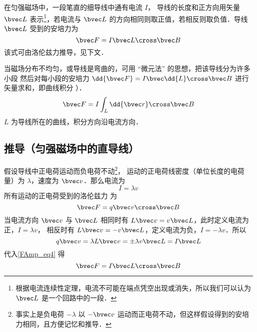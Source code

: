 

在匀强磁场中，一段笔直的细导线中通有电流 $I$， 导线的长度和正方向用矢量 $\bvec L$ 表示\footnote{根据电流连续性定理，电流不可能在端点凭空出现或消失，所以我们可以认为 $\bvec L$ 是一个回路中的一段．}，若电流与 $\bvec L$ 的方向相同则取正值，若相反则取负值．导线 $\bvec L$ 受到的安培力为
\begin{equation}\label{FAmp_eq1}
\bvec F = I \bvec L \cross \bvec B
\end{equation}
该式可由洛伦兹力推导，见下文．

当磁场分布不均匀，或导线是弯曲的，可用 “微元法” 的思想，把该导线分为许多小段
然后对每小段的安培力 $\dd{\bvec F} = I\bvec \dd{L} \cross\bvec B$ 进行矢量求和，即曲线积分%
）．
\begin{equation}
\bvec F = I\int_L \dd{\bvec r} \cross \bvec B
\end{equation}
$L$ 为导线所在的曲线，积分方向沿电流方向．

\subsection{推导（匀强磁场中的直导线）}
假设导线中正电荷运动而负电荷不动\footnote{事实上是负电荷 $-\lambda$ 以 $-\bvec v$ 运动而正电荷不动，但这样假设得到的安培力相同，且方便记忆和推导．}， 运动的正电荷线密度（单位长度的电荷量）为 $\lambda$，速度为 $\bvec v$．那么电流为%
\begin{equation}
I = \lambda v
\end{equation}
所有运动的正电荷受到的洛伦兹力%
为
\begin{equation}\label{FAmp_eq4}
\bvec F =  q\bvec v \cross \bvec B
\end{equation}
当电流方向 $\bvec v$ 与 $\bvec L$ 相同时有 $L \bvec v = v \bvec L$，此时定义电流为正，$I = \lambda v$， 相反时有 $L \bvec v = -v\bvec L$，定义电流为负，$I = -\lambda v$．所以
\begin{equation}
q\bvec v = \lambda L \bvec v = \pm \lambda v\bvec L= I \bvec L
\end{equation}
代入\autoref{FAmp_eq4} 得
\begin{equation}
\bvec F = I \bvec L \cross \bvec B
\end{equation}


















